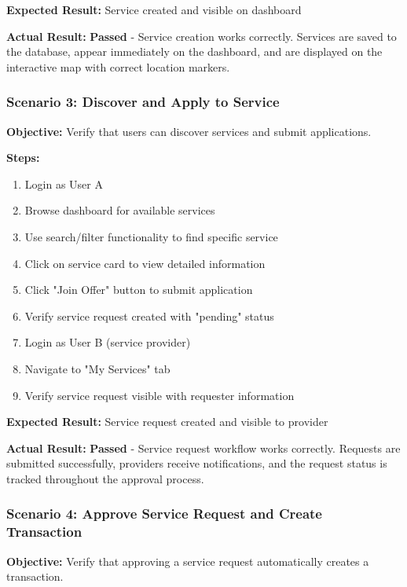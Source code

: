 \documentclass[12pt,a4paper]{report}
\begin{document}
\textbf{Expected Result:} Service created and visible on dashboard

\textbf{Actual Result:} \textbf{Passed} - Service creation works correctly. Services are saved to the database, appear immediately on the dashboard, and are displayed on the interactive map with correct location markers.

\subsubsection{Scenario 3: Discover and Apply to Service}

\textbf{Objective:} Verify that users can discover services and submit applications.

\textbf{Steps:}
\begin{enumerate}
    \item Login as User A
    \item Browse dashboard for available services
    \item Use search/filter functionality to find specific service
    \item Click on service card to view detailed information
    \item Click "Join Offer" button to submit application
    \item Verify service request created with "pending" status
    \item Login as User B (service provider)
    \item Navigate to "My Services" tab
    \item Verify service request visible with requester information
\end{enumerate}

\textbf{Expected Result:} Service request created and visible to provider

\textbf{Actual Result:} \textbf{Passed} - Service request workflow works correctly. Requests are submitted successfully, providers receive notifications, and the request status is tracked throughout the approval process.

\subsubsection{Scenario 4: Approve Service Request and Create Transaction}

\textbf{Objective:} Verify that approving a service request automatically creates a transaction.
\end{document}
